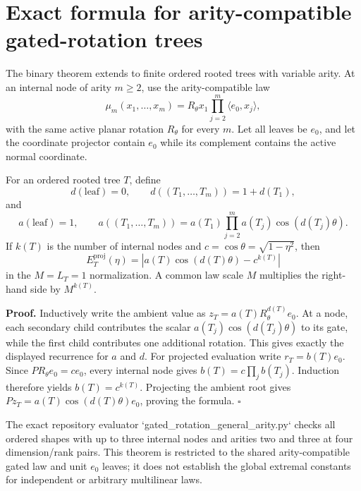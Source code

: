\section*{Exact formula for arity-compatible gated-rotation trees}
\label{sec:gated-rotation-general-arity}

The binary theorem extends to finite ordered rooted trees with variable
arity.  At an internal node of arity $m\ge2$, use the arity-compatible law
\[
  \mu_m(x_1,\ldots,x_m)
  =R_\theta x_1\prod_{j=2}^m\langle e_0,x_j\rangle,
\]
with the same active planar rotation $R_\theta$ for every $m$.  Let all
leaves be $e_0$, and let the coordinate projector contain $e_0$ while its
complement contains the active normal coordinate.

For an ordered rooted tree $T$, define
\[
 d(\text{leaf})=0,\qquad d((T_1,\ldots,T_m))=1+d(T_1),
\]
and
\[
 a(\text{leaf})=1,\qquad
 a((T_1,\ldots,T_m))
 =a(T_1)\prod_{j=2}^m a(T_j)\cos(d(T_j)\theta).
\]
If $k(T)$ is the number of internal nodes and
$c=\cos\theta=\sqrt{1-\eta^2}$, then
\[
  \boxed{
  E_T^{\mathrm{proj}}(\eta)=
  \left|a(T)\cos(d(T)\theta)-c^{k(T)}\right|
  }
\]
in the $M=L_T=1$ normalization.  A common law scale $M$ multiplies the
right-hand side by $M^{k(T)}$.

\textbf{Proof.}  Inductively write the ambient value as
$z_T=a(T)R_\theta^{d(T)}e_0$.  At a node, each secondary child contributes
the scalar
$a(T_j)\cos(d(T_j)\theta)$ to its gate, while the first child contributes
one additional rotation.  This gives exactly the displayed recurrence for
$a$ and $d$.  For projected evaluation write $r_T=b(T)e_0$.  Since
$P R_\theta e_0=c e_0$, every internal node gives
$b(T)=c\prod_j b(T_j)$.  Induction therefore yields
$b(T)=c^{k(T)}$.  Projecting the ambient root gives
$Pz_T=a(T)\cos(d(T)\theta)e_0$, proving the formula. $\square$

The exact repository evaluator `gated_rotation_general_arity.py` checks all
ordered shapes with up to three internal nodes and arities two and three at
four dimension/rank pairs.  This theorem is restricted to the shared
arity-compatible gated law and unit $e_0$ leaves; it does not establish the
global extremal constants for independent or arbitrary multilinear laws.
